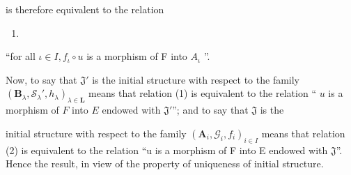 is therefore equivalent to the relation

\begin{enumerate}
\def\labelenumi{(\arabic{enumi})}
\setcounter{enumi}{1}
\tightlist
\item
\end{enumerate}

``for all \(\iota\in I,f_{\iota}\circ u\) is a morphism of F into \(A_{\iota}\) ''.

Now, to say that \(\mathfrak{J}'\) is the initial structure with respect to the family \((\mathbf{B}_{\lambda}, \mathcal{S}_{\lambda}', h_{\lambda})_{\lambda \in \mathbf{L}}\) means that relation (1) is equivalent to the relation `` \(u\) is a morphism of \(F\) into \(E\) endowed with \(\mathfrak{J}'\)''; and to say that \(\mathfrak{J}\) is the

initial structure with respect to the family \((\mathbf{A}_{i}, \mathcal{G}_{i}, f_{i})_{i \in I}\) means that relation (2) is equivalent to the relation ``u is a morphism of F into E endowed with \(\mathfrak{J}\)''. Hence the result, in view of the property of uniqueness of initial structure.

